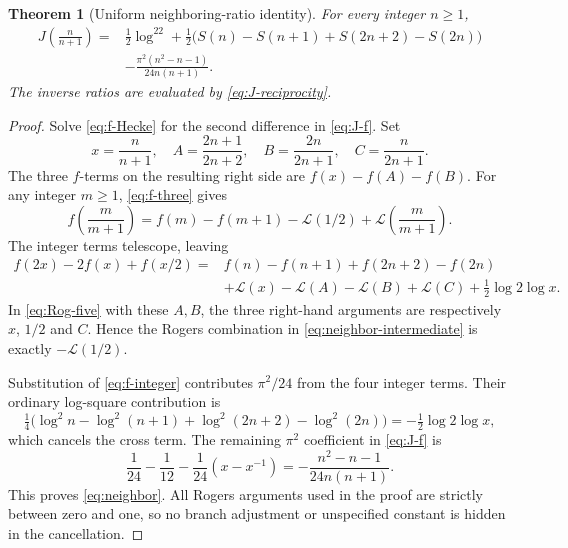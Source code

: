 \documentclass[11pt]{article}
\numberwithin{equation}{section}
\newtheorem{theorem}{Theorem}[section]
\theoremstyle{definition}
\theoremstyle{remark}
\newcommand{\Rog}{\mathcal L}
\begin{document}
\begin{theorem}[Uniform neighboring-ratio identity]\label{thm:neighbor}
For every integer $n\ge1$,
\begin{equation}\label{eq:neighbor}
 \boxed{\begin{aligned}
 J\left(\frac n{n+1}\right)={}&\frac12\log^22
 +\frac12\bigl(S(n)-S(n+1)+S(2n+2)-S(2n)\bigr)\\
 &-\frac{\pi^2(n^2-n-1)}{24n(n+1)}.
 \end{aligned}}
\end{equation}
The inverse ratios are evaluated by \eqref{eq:J-reciprocity}.
\end{theorem}
\begin{proof}
Solve \eqref{eq:f-Hecke} for the second difference in
\eqref{eq:J-f}. Set
\[
 x=\frac n{n+1},\quad A=\frac{2n+1}{2n+2},\quad
 B=\frac{2n}{2n+1},\quad C=\frac n{2n+1}.
\]
The three $f$-terms on the resulting right side are $f(x)-f(A)-f(B)$.
For any integer $m\ge1$, \eqref{eq:f-three} gives
\[
 f\left(\frac m{m+1}\right)=f(m)-f(m+1)-\Rog(1/2)
                                      +\Rog\left(\frac m{m+1}\right).
\]
The integer terms telescope, leaving
\begin{equation}\label{eq:neighbor-intermediate}
 \begin{split}
 f(2x)-2f(x)+f(x/2)={}&f(n)-f(n+1)+f(2n+2)-f(2n)\\
 &+\Rog(x)-\Rog(A)-\Rog(B)+\Rog(C)
   +\tfrac12\log2\log x.
 \end{split}
\end{equation}
In \eqref{eq:Rog-five} with these $A,B$, the three right-hand arguments
are respectively $x$, $1/2$ and $C$. Hence the Rogers combination in
\eqref{eq:neighbor-intermediate} is exactly $-\Rog(1/2)$.

Substitution of \eqref{eq:f-integer} contributes $\pi^2/24$ from the
four integer terms. Their ordinary log-square contribution is
\[
 \tfrac14\bigl(\log^2n-\log^2(n+1)+\log^2(2n+2)-\log^2(2n)\bigr)
 =-\tfrac12\log2\log x,
\]
which cancels the cross term. The remaining $\pi^2$ coefficient in
\eqref{eq:J-f} is
\[
 \frac1{24}-\frac1{12}-\frac1{24}(x-x^{-1})
 =-\frac{n^2-n-1}{24n(n+1)}.
\]
This proves \eqref{eq:neighbor}. All Rogers arguments used in the proof
are strictly between zero and one, so no branch adjustment or unspecified
constant is hidden in the cancellation.
\end{proof}
\end{document}
